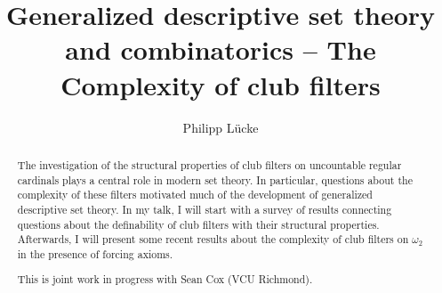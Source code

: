 \documentclass{amsart}
\title{Generalized descriptive set theory and combinatorics -- The Complexity of club filters}
\author{Philipp L\"ucke}
\begin{document}
\begin{abstract}
   The investigation of the structural properties of club filters on uncountable regular cardinals plays a central role in modern set theory.    
   In particular, questions about the complexity of these filters motivated much of the development of generalized descriptive set theory. In my talk, I will start with a survey of results connecting questions about the definability of club filters with their  structural properties. Afterwards, I will present some recent results about the complexity of club filters on $\omega_2$ in the presence of forcing axioms. 

  This is joint work in progress with Sean Cox (VCU Richmond). 
\end{abstract}


\maketitle
\end{document}
